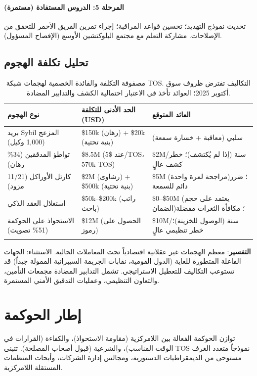 \documentclass[11pt]{article}
\begin{document}
\paragraph{المرحلة 5: الدروس المستفادة (مستمرة)}
تحديث نموذج التهديد؛ تحسين قواعد المراقبة؛ إجراء تمرين الفريق الأحمر للتحقق من الإصلاحات. مشاركة التعلم مع مجتمع البلوكتشين الأوسع (الإفصاح المسؤول).

\subsection{تحليل تكلفة الهجوم}

\begin{longtable}{@{}p{}p{}p{}@{}}
\toprule
\textbf{نوع الهجوم} & \textbf{الحد الأدنى للتكلفة (USD)} & \textbf{العائد المتوقع} \\\midrule
بريد Sybil المزعج (1,000 وكيل) & \$150k (رهان) + \$20k (بنية تحتية) & سلبي (معاقبة + خسارة سمعة) \\
تواطؤ المدققين (34\% رهان) & \$8.5M (عند \$5/TOS، 570k TOS) & \$2M/سنة (إذا لم يُكتشف)؛ خطر كشف عالٍ \\
كارتل الأوراكل (11/21 مزود) & \$2M (رشاوى) + \$500k (بنية تحتية) & \$5M (مراجحة لمرة واحدة)؛ ضرر دائم للسمعة \\
استغلال العقد الذكي & \$50k--\$200k (راتب باحث) & \$0--\$50M (يعتمد على حجم الضمان)؛ مكافأة الثغرات مفضلة \\
الاستحواذ على الحوكمة (51\% تصويت) & \$12M (الحصول على رموز) & \$10M/سنة (الوصول للخزينة)؛ خطر تنظيمي عالٍ \\
\bottomrule
\caption{مصفوفة التكلفة والفائدة الخصمية لهجمات شبكة TOS. التكاليف تفترض ظروف سوق أكتوبر 2025؛ العوائد تأخذ في الاعتبار احتمالية الكشف والتدابير المضادة.}
\end{longtable}

\textbf{التفسير}: معظم الهجمات غير عقلانية اقتصادياً تحت المعاملات الحالية. الاستثناء: الجهات الفاعلة المتطورة للغاية (الدول القومية، نقابات الجريمة السيبرانية الممولة جيداً) قد تستوعب التكاليف للتعطيل الاستراتيجي. تشمل التدابير المضادة مجمعات التأمين، والتعاون التنظيمي، وعمليات التدقيق الأمني المستمرة.

\section{إطار الحوكمة}
\label{sec:governance}

توازن الحوكمة الفعالة بين اللامركزية (مقاومة الاستحواذ)، والكفاءة (القرارات في الوقت المناسب)، والشرعية (قبول أصحاب المصلحة). تتبنى TOS نموذجاً متعدد الغرف مستوحى من الديمقراطيات الدستورية، ومجالس إدارة الشركات، وأبحاث المنظمات المستقلة اللامركزية.
\end{document}
